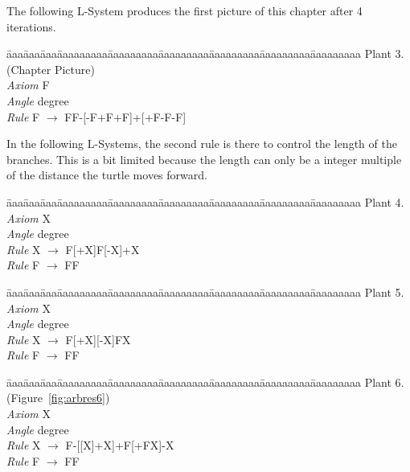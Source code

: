 The following L-System produces the first picture of this chapter
after 4 iterations.
\begin{tabbing}
\=aaa\=aaa\=aaa\=aaaaaaaaa\=aaaaaaaaa\=aaaaaaaaa\=aaaaaaaaa\=aaaaaaaaa\=aaaaaaaaa\kill
Plant 3. (Chapter Picture)\\
\>\>\>\> \emph{Axiom} \>\>F\\
\>\>\>\> \emph{Angle} \> degree\\
\>\>\>\> \emph{Rule}  \>\>F $\rightarrow$ FF-[-F+F+F]+[+F-F-F]
\end{tabbing}


In the following L-Systems, the second rule is there to control the
length of the branches. This is a bit limited because the length can
only be a integer multiple of the distance the turtle moves forward.


\begin{tabbing}
\=aaa\=aaa\=aaa\=aaaaaaaaa\=aaaaaaaaa\=aaaaaaaaa\=aaaaaaaaa\=aaaaaaaaa\=aaaaaaaaa\kill
Plant 4.\\
\>\>\>\> \emph{Axiom} \>\>X\\
\>\>\>\> \emph{Angle} \> degree\\
\>\>\>\> \emph{Rule}  \>\>X $\rightarrow$ F[+X]F[-X]+X\\
\>\>\>\> \emph{Rule}  \>\>F $\rightarrow$ FF
\end{tabbing}



\begin{tabbing}
\=aaa\=aaa\=aaa\=aaaaaaaaa\=aaaaaaaaa\=aaaaaaaaa\=aaaaaaaaa\=aaaaaaaaa\=aaaaaaaaa\kill
Plant 5.\\
\>\>\>\> \emph{Axiom} \>\>X\\
\>\>\>\> \emph{Angle} \> degree\\
\>\>\>\> \emph{Rule}  \>\>X $\rightarrow$ F[+X][-X]FX\\
\>\>\>\> \emph{Rule}  \>\>F $\rightarrow$ FF
\end{tabbing}

\begin{tabbing}
\=aaa\=aaa\=aaa\=aaaaaaaaa\=aaaaaaaaa\=aaaaaaaaa\=aaaaaaaaa\=aaaaaaaaa\=aaaaaaaaa\kill
Plant 6. (Figure~\ref{fig:arbres6})\\
\>\>\>\> \emph{Axiom} \>\>X\\
\>\>\>\> \emph{Angle} \> degree\\
\>\>\>\> \emph{Rule}  \>\>X $\rightarrow$ F-[[X]+X]+F[+FX]-X\\
\>\>\>\> \emph{Rule}  \>\>F $\rightarrow$ FF
\end{tabbing}

